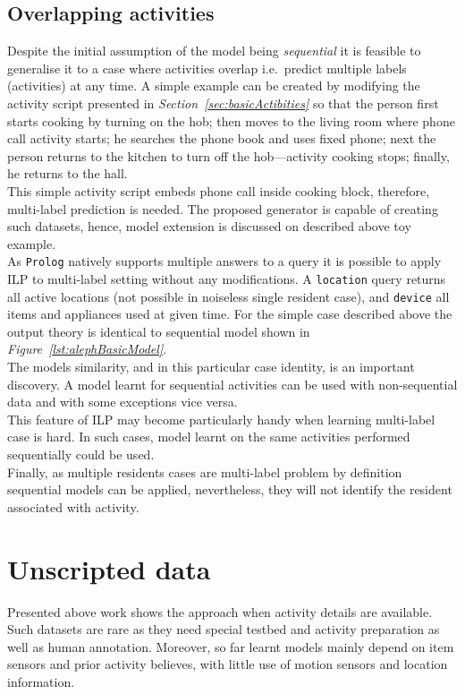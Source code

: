 \documentclass[11pt, a4paper, pdflatex, leqno, twoside, openright]{report}
\begin{document}
    \subsection{Overlapping activities}
Despite the initial assumption of the model being \emph{sequential} it is feasible to generalise it to a case where activities overlap i.e.\ predict multiple labels (activities) at any time. A simple example can be created by modifying the activity script presented in \emph{Section~\ref{sec:basicActibities}} so that the person first starts cooking by turning on the hob; then moves to the living room where phone call activity starts; he searches the phone book and uses fixed phone; next the person returns to the kitchen to turn off the hob---activity cooking stops; finally, he returns to the hall.\\
This simple activity script embeds phone call inside cooking block, therefore, multi-label prediction is needed. The proposed generator is capable of creating such datasets, hence, model extension is discussed on described above toy example.\\

As \texttt{Prolog} natively supports multiple answers to a query it is possible to apply ILP to multi-label setting without any modifications. A \texttt{location} query returns all active locations (not possible in noiseless single resident case), and \texttt{device} all items and appliances used at given time. For the simple case described above the output theory is identical to sequential model shown in \emph{Figure~\ref{lst:alephBasicModel}}.\\

The models similarity, and in this particular case identity, is an important discovery. A model learnt for sequential activities can be used with non-sequential data and with some exceptions vice versa.\\
This feature of ILP may become particularly handy when learning multi-label case is hard. In such cases, model learnt on the same activities performed sequentially could be used.\\
Finally, as multiple residents cases are multi-label problem by definition sequential models can be applied, nevertheless, they will not identify the resident associated with activity.

  \section{Unscripted data}
Presented above work shows the approach when activity details are available. Such datasets are rare as they need special testbed and activity preparation as well as human annotation. Moreover, so far learnt models mainly depend on item sensors and prior activity believes, with little use of motion sensors and location information.\\
\end{document}
